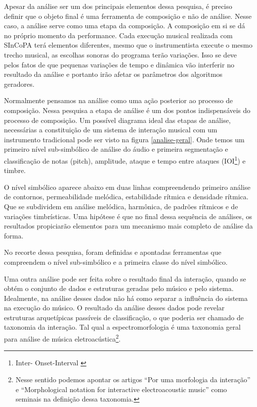\documentclass{ppgmus}
\begin{document}
Apesar da análise ser um dos principais elementos dessa pesquisa, é preciso
definir que o objeto final é uma ferramenta de composição e não de análise.
Nesse caso, a análise serve como uma etapa da composição. A composição em si
se dá no próprio momento da performance. Cada execução musical realizada
com SInCoPA terá elementos diferentes, mesmo que o instrumentista execute
o mesmo trecho musical, as escolhas sonoras do programa terão variações.
Isso se deve pelos fatos de que pequenas variações de tempo e dinâmica 
vão interferir no resultado da análise e portanto irão afetar os parâmetros
dos algoritmos geradores.

Normalmente pensamos na análise
como uma ação posterior ao processo de composição. Nessa pesquisa a etapa
de análise é um dos pontos indispensáveis do processo de composição.
Um possível diagrama ideal das etapas de análise, necessárias a
constituição de um sistema de interação musical com um instrumento
tradicional pode ser visto na figura \ref{analise-geral}. Onde temos um
primeiro nível sub-simbólico de análise do áudio e primeira segmentação
e classificação de notas (pitch), amplitude, ataque e tempo entre ataques (IOI\footnote{Inter-
Onset-Interval \cite{rowe2004machine}}) e timbre.

O nível simbólico aparece abaixo em duas linhas compreendendo primeiro análise de 
contornos, permeabilidade melódica, estabilidade rítmica e densidade rítmica. 
Que se subdividem em análise melódica, harmônica, de padrões rítmicos e de 
variações timbrísticas. Uma hipótese é que no final dessa sequência de análises,
os resultados propiciarão elementos para um mecanismo mais completo de análise da
forma.



No recorte dessa pesquisa, foram definidas e apontadas ferramentas que compreendem o nível
sub-simbólico e a primeira classe do nível simbólico. 


Uma outra análise pode ser feita sobre o resultado final da interação, quando se obtém
o conjunto de dados e estruturas geradas pelo músico e pelo sistema. Idealmente, na análise desses 
dados não há como separar
a influência do sistema na execução do músico. O resultado da análise desses dados pode revelar
estruturas arquetípicas passíveis de classificação, o que poderia ser chamado de taxonomia 
da interação. Tal qual a espectromorfologia \cite{smalley:86} é uma taxonomia geral
para análise de música eletroacústica\footnote{Nesse sentido podemos apontar os artigos
``Por uma morfologia da interação'' \cite{menezes2006musica} e ``Morphological notation for interactive electroacoustic music'' 
\cite{Patton:2007} como seminais na definição dessa taxonomia.}.
\end{document}
